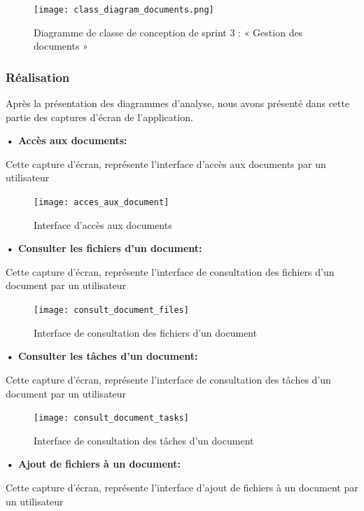 \begin{figure}[H]
  \centering
  \texttt{[image: class\_diagram\_documents.png]}
  \caption{Diagramme de classe de conception de sprint 3 : « Gestion des documents »}
  \label{fig:diagramme_de_classe_de_conception_de_sprint_3_gestion_des_documents}
\end{figure}


\subsubsection{Réalisation}

Après la présentation des diagrammes d'analyse, nous avons présenté dans cette partie des captures d'écran de l'application.

\textbf{•	Accès aux documents:}

Cette capture d'écran, représente l'interface d'accès aux documents par un utilisateur

\begin{figure}[H]
  \centering
  \texttt{[image: acces\_aux\_document]}
  \caption{Interface d'accès aux documents}
  \label{fig:acces_aux_document}
\end{figure}

\textbf{•	Consulter les fichiers d'un document:}

Cette capture d'écran, représente l'interface de consultation des fichiers d'un document par un utilisateur

\begin{figure}[H]
  \centering
  \texttt{[image: consult\_document\_files]}
  \caption{Interface de consultation des fichiers d'un document}
  \label{fig:consult_document_files}
\end{figure}

\textbf{•	Consulter les tâches d'un document:}

Cette capture d'écran, représente l'interface de consultation des tâches d'un document par un utilisateur

\begin{figure}[H]
  \centering
  \texttt{[image: consult\_document\_tasks]}
  \caption{Interface de consultation des tâches d'un document}
  \label{fig:consult_document_tasks}
\end{figure}

\textbf{•	Ajout de fichiers à un document:}

Cette capture d'écran, représente l'interface d'ajout de fichiers à un document par un utilisateur

